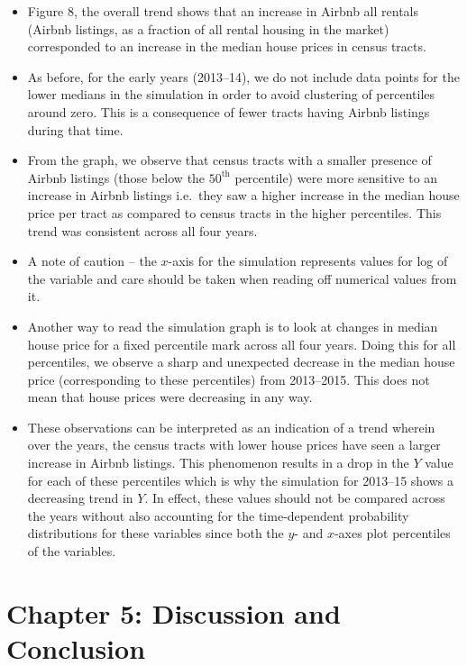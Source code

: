 \documentclass[10pt,letterpaper,onecolumn]{article}
\begin{document}
\begin{itemize}
\item Figure 8, the overall trend shows that an increase in Airbnb all
rentals (Airbnb listings, as a fraction of all rental housing in the
market) corresponded to an increase in the median house prices in
census tracts.
\item
As before, for the early years (2013--14), we do not include data
points for the lower medians in the simulation in order to avoid
clustering of percentiles around zero. This is a consequence of fewer
tracts having Airbnb listings during that time.
\item
From the graph, we observe that census tracts with a smaller presence
of Airbnb listings (those below the \(50^\text{th}\) percentile) were more
sensitive to an increase in Airbnb listings i.e.\ they saw a higher
increase in the median house price per tract as compared to census
tracts in the higher percentiles. This trend was consistent across all
four years.
\item
A note of caution -- the \(x\)-axis for the simulation represents values
for log of the variable and care should be taken when reading off
numerical values from it.
\item
Another way to read the simulation graph is to look at changes in
median house price for a fixed percentile mark across all four years.
Doing this for all percentiles, we observe a sharp and unexpected
decrease in the median house price (corresponding to these
percentiles) from 2013--2015. This does not mean that house prices were
decreasing in any way.
\item These observations can be interpreted as an indication of a trend
wherein over the years, the census tracts with lower house prices have
seen a larger increase in Airbnb listings. This phenomenon results in
a drop in the \(Y\) value for each of these percentiles which is why the
simulation for 2013--15 shows a decreasing trend in \(Y\). In effect, these
values should not be compared across the years without also accounting
for the time-dependent probability distributions for these variables
since both the \(y\)- and \(x\)-axes plot percentiles of the variables.
\end{itemize}


\section*{Chapter 5: Discussion and Conclusion}\label{sec: discussion-and-conclusion}
\end{document}
